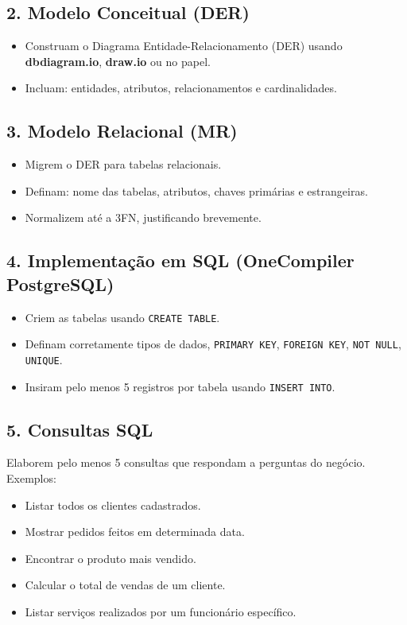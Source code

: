 \documentclass[12pt,a4paper]{article}
\begin{document}
\subsection*{2. Modelo Conceitual (DER)}
\begin{itemize}
    \item Construam o Diagrama Entidade-Relacionamento (DER) usando \textbf{dbdiagram.io}, \textbf{draw.io} ou no papel.
    \item Incluam: entidades, atributos, relacionamentos e cardinalidades.
\end{itemize}

\subsection*{3. Modelo Relacional (MR)}
\begin{itemize}
    \item Migrem o DER para tabelas relacionais.
    \item Definam: nome das tabelas, atributos, chaves primárias e estrangeiras.
    \item Normalizem até a 3FN, justificando brevemente.
\end{itemize}

\subsection*{4. Implementação em SQL (OneCompiler PostgreSQL)}
\begin{itemize}
    \item Criem as tabelas usando \texttt{CREATE TABLE}.
    \item Definam corretamente tipos de dados, \texttt{PRIMARY KEY}, \texttt{FOREIGN KEY}, \texttt{NOT NULL}, \texttt{UNIQUE}.
    \item Insiram pelo menos 5 registros por tabela usando \texttt{INSERT INTO}.
\end{itemize}

\subsection*{5. Consultas SQL}
Elaborem pelo menos 5 consultas que respondam a perguntas do negócio. Exemplos:
\begin{itemize}
    \item Listar todos os clientes cadastrados.
    \item Mostrar pedidos feitos em determinada data.
    \item Encontrar o produto mais vendido.
    \item Calcular o total de vendas de um cliente.
    \item Listar serviços realizados por um funcionário específico.
\end{itemize}
\end{document}
